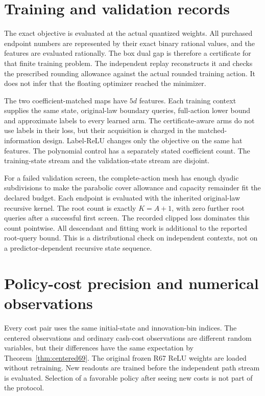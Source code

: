 \section{Training and validation records}\label{supp:training69}

The exact objective is evaluated at the actual quantized weights. All purchased endpoint numbers are represented by their exact binary rational values, and the features are evaluated rationally. The box dual gap is therefore a certificate for that finite training problem. The independent replay reconstructs it and checks the prescribed rounding allowance against the actual rounded training action. It does not infer that the floating optimizer reached the minimizer.

The two coefficient-matched maps have $5d$ features. Each training context supplies the same state, original-law boundary queries, full-action lower bound and approximate labels to every learned arm. The certificate-aware arms do not use labels in their loss, but their acquisition is charged in the matched-information design. Label-ReLU changes only the objective on the same hat features. The polynomial control has a separately stated coefficient count. The training-state stream and the validation-state stream are disjoint.


For a failed validation screen, the complete-action mesh has enough dyadic subdivisions to make the parabolic cover allowance and capacity remainder fit the declared budget. Each endpoint is evaluated with the inherited original-law recursive kernel. The root count is exactly $K=A+1$, with zero further root queries after a successful first screen. The recorded clipped loss dominates this count pointwise. All descendant and fitting work is additional to the reported root-query bound. This is a distributional check on independent contexts, not on a predictor-dependent recursive state sequence.

\section{Policy-cost precision and numerical observations}\label{supp:precision69}

Every cost pair uses the same initial-state and innovation-bin indices. The centered observations and ordinary cash-cost observations are different random variables, but their differences have the same expectation by Theorem~\ref{thm:centered69}. The original frozen R67 ReLU weights are loaded without retraining. New readouts are trained before the independent path stream is evaluated. Selection of a favorable policy after seeing new costs is not part of the protocol.

